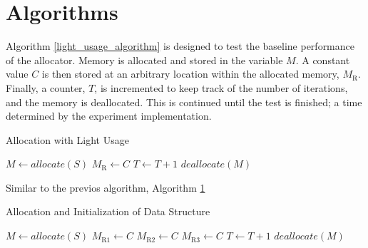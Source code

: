 \documentclass[letterpaper, 10 pt, conference]{ieeeconf}  %
\begin{document}


\section{Algorithms}

Algorithm \ref{light_usage_algorithm} is designed to test the baseline performance of the allocator.
Memory is allocated and stored in the variable $M$.
A constant value $C$ is then stored at an arbitrary location within the allocated memory, $M_\text{R}$.
Finally, a counter, $T$, is incremented to keep track of the number of iterations, and the memory is deallocated.
This is continued until the test is finished; a time determined by the experiment implementation.

\begin{algorithm}[h]
\caption{Allocation with Light Usage}
\begin{algorithmic}
  \STATE $M \leftarrow allocate(S)$
  \STATE $M_\text{R} \leftarrow C$
  \STATE $T \leftarrow T + 1$
  \STATE $deallocate(M)$
\ENDWHILE
\end{algorithmic}
\label{light_usage_algorithm}
\end{algorithm}

Similar to the previos algorithm, Algorithm \ref{}

\begin{algorithm}[h]
  \caption{Allocation and Initialization of Data Structure}
  \begin{algorithmic}
      \STATE $M \leftarrow allocate(S)$
      \STATE $M_\text{R1} \leftarrow C$
      \STATE $M_\text{R2} \leftarrow C$
      \STATE $M_\text{R3} \leftarrow C$
      \STATE $T \leftarrow T + 1$
      \STATE $deallocate(M)$
    \ENDWHILE
  \end{algorithmic}
  \label{struct_usage_algorithm}
\end{algorithm}
\end{document}

